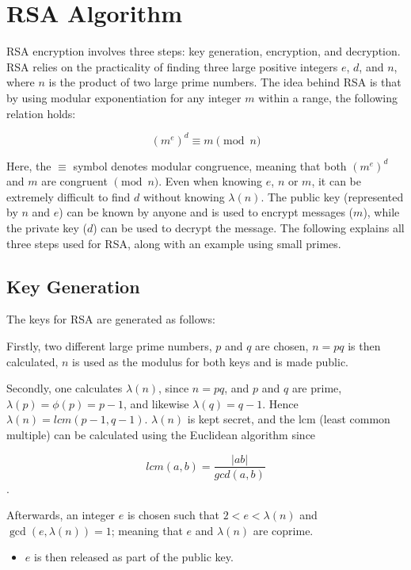 \section{RSA Algorithm}\label{sec:section3}

RSA encryption involves three steps: key generation, encryption, and decryption. RSA relies on the practicality of finding three large positive integers $e$, $d$, and $n$, where $n$ is the product of two large prime numbers. The idea behind RSA is that by using modular exponentiation for any integer $m$ within a range, the following relation holds:

$$(m^e)^d \equiv m \pmod{n}$$

Here, the $\equiv$ symbol denotes modular congruence, meaning that both $(m^e)^d$ and $m$ are congruent $\pmod{n}$. Even when knowing $e$, $n$ or $m$, it can be extremely difficult to find $d$ without knowing $\lambda(n)$. The public key (represented by $n$ and $e$) can be known by anyone and is used to encrypt messages ($m$), while the private key ($d$) can be used to decrypt the message. The following explains all three steps used for RSA, along with an example using small primes.

\subsection{Key Generation}\label{sec:section3.1}

The keys for RSA are generated as follows:

Firstly, two different large prime numbers, $p$ and $q$ are chosen, $n = pq$ is then calculated, $n$ is used as the modulus for both keys and is made public.

Secondly, one calculates $\lambda (n)$, since $n = pq$, and $p$ and $q$ are prime, $\lambda(p)= \phi(p) = p-1$, and likewise $\lambda(q) = q-1$. Hence $\lambda(n) = lcm(p-1, q-1)$. $\lambda(n)$ is kept secret, and the lcm (least common multiple) can be calculated using the Euclidean algorithm since

$$lcm(a,b)= \frac{\left| ab \right|}{gcd \left( a,b \right)}$$.

Afterwards, an integer $e$ is chosen such that $2 < e < \lambda(n)$ and $\gcd(e, \lambda(n))=1$; meaning that $e$ and $\lambda(n)$ are coprime.

\begin{itemize}
  \item $e$ is then released as part of the public key.
\end{itemize}

